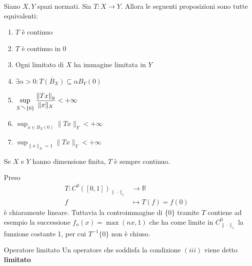 \begin{theorem}{}
    Siano \(X, Y\) spazi normati. Sia \(T : X \to Y\). Allora le seguenti
    proposizioni sono tutte equivalenti:
\begin{enumerate}[label = (\roman*)]
    \item \(T\) è continuo
    \item \(T\) è continuo in 0
    \item Ogni limitato di \(X\) ha immagine limitata in \(Y\) 
\item \(\displaystyle \exists \alpha>0 : \overline{T{(B_X)}} \subseteq \alpha B_Y{(0)}\) 
    \item \(\displaystyle \sup_{X \sminus \{0\} } \frac{\|Tx\|_y}{\|x\|_X} < +\infty\) 
    \item \(\displaystyle \sup_{x \in B_X{(0)}} \|Tx\|_Y < +\infty\) 
    \item \(\displaystyle\sup_{\|x\|_X=1} \|Tx\|_Y < +\infty\) 
\end{enumerate}
\end{theorem}
\begin{remark}{}
    Se \(X\) e \(Y\) hanno dimensione finita, \(T\) è sempre continuo.
\end{remark}
\begin{example}{}
    Preso \begin{align*}
        T: C^{0}{([0,1])}_{\|\cdot \|_1}  &\longrightarrow \mathbb{R} \\
        f &\longmapsto T(f) = f{(0)}
    \end{align*}
    è chiaramente lineare. Tuttavia la controimmagine di \(\{0\} \) tramite \(T\) contiene
    ad esempio la successione \(f_{n}{(x)} = \max(nx,1)\) che ha come limite in \(C^{0}_{\|\cdot\|_1} \) la funzione costante 1, per cui \(T^{-1}\{0\} \) non è chiuso.
\end{example}
\begin{definition}{Operatore limitato}
    Un operatore che soddisfa la condizione \({(iii)}\) viene detto
    \textbf{limitato}
\end{definition}
